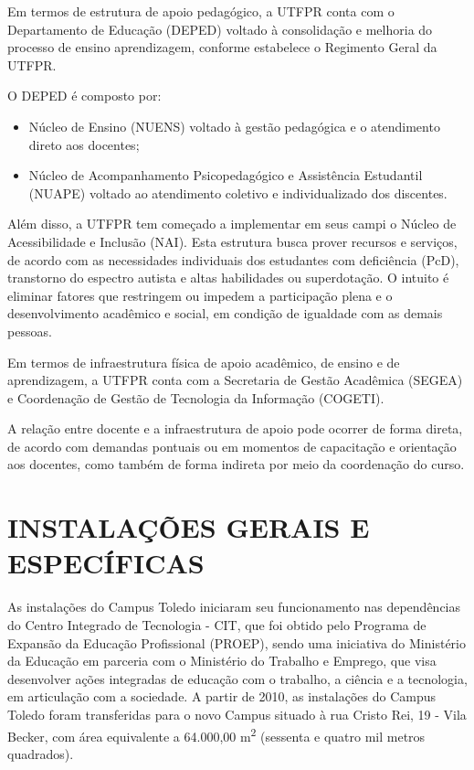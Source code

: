Em termos de estrutura de apoio pedagógico, a UTFPR conta com o Departamento de Educação (DEPED) voltado à consolidação e melhoria do processo de ensino aprendizagem, conforme estabelece o Regimento Geral da UTFPR.

O DEPED é composto por:

\begin{itemize}
    \item Núcleo de Ensino (NUENS) voltado à gestão pedagógica e o atendimento direto aos docentes;
    \item Núcleo de Acompanhamento Psicopedagógico e Assistência Estudantil (NUAPE) voltado ao atendimento coletivo e individualizado dos discentes.
\end{itemize}

Além disso, a UTFPR tem começado a implementar em seus campi o Núcleo de Acessibilidade e Inclusão (NAI). Esta estrutura busca prover recursos e serviços, de acordo com as necessidades individuais dos estudantes com deficiência (PcD), transtorno do espectro autista e altas habilidades ou superdotação. O intuito é eliminar fatores que restringem ou impedem a participação plena e o desenvolvimento acadêmico e social, em condição de igualdade com as demais pessoas.

Em termos de infraestrutura física de apoio acadêmico, de ensino e de aprendizagem, a UTFPR conta com a Secretaria de Gestão Acadêmica (SEGEA) e Coordenação de Gestão de Tecnologia da Informação (COGETI).

A relação entre docente e a infraestrutura de apoio pode ocorrer de forma direta, de acordo com demandas pontuais ou em momentos de capacitação e orientação aos docentes, como também de forma indireta por meio da coordenação do curso.


\section{INSTALAÇÕES GERAIS E ESPECÍFICAS}

As instalações do Campus Toledo iniciaram seu funcionamento nas dependências do Centro Integrado de Tecnologia - CIT, que foi obtido pelo Programa de Expansão da Educação Profissional (PROEP), sendo uma iniciativa do Ministério da Educação em parceria com o Ministério do Trabalho e Emprego, que visa desenvolver ações integradas de educação com o trabalho, a ciência e a tecnologia, em articulação com a sociedade. A partir de 2010, as instalações do Campus Toledo foram transferidas para o novo Campus situado à rua Cristo Rei, 19 - Vila Becker, com área equivalente a 64.000,00 m\textsuperscript{2} (sessenta e quatro mil metros quadrados).

